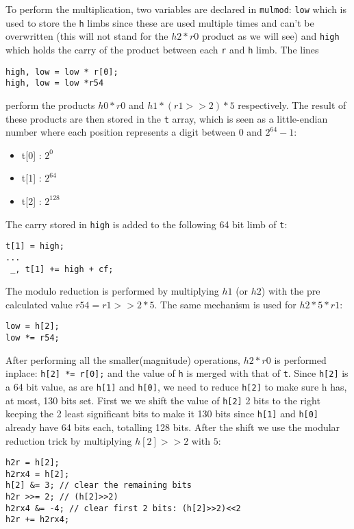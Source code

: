 \documentclass[twocolumn]{article}
\begin{document}
To perform the multiplication, two variables are declared in \texttt{mulmod}: \texttt{low} which is used to store the \texttt{h} limbs since these are used multiple
times and can't be overwritten (this will not stand for the $h2*r0$ product as we will see) and \texttt{high} which holds the carry of the product between 
each \texttt{r} and \texttt{h} limb. The lines 
\begin{Verbatim}[fontsize=\footnotesize]
high, low = low * r[0];
high, low = low *r54
\end{Verbatim}
perform the products $h0*r0$ and $h1*(r1>>2)*5$ respectively.
The result of these products are then stored in the \texttt{t} array, which is seen as a little-endian number where each position represents a digit between $0$ 
and $2^{64}-1$: 
\begin{itemize}
    \item t[0] : $2^{0}$
    \item t[1] : $2^{64}$
    \item t[2] : $2^{128}$
\end{itemize}

The carry stored in \texttt{high} is added to the following 64 bit limb of \texttt{t}:
\begin{Verbatim}[fontsize=\footnotesize]
t[1] = high;
...
 _, t[1] += high + cf;
\end{Verbatim}
The modulo reduction is performed by multiplying $h1$ (or $h2$) with the pre calculated value $r54=r1>>2*5$. The same mechanism is used for $h2*5*r1$:
\begin{Verbatim}[fontsize=\footnotesize]
low = h[2];
low *= r54;
\end{Verbatim}

After performing all the smaller(magnitude) operations, $h2*r0$ is performed inplace: \texttt{h[2] *= r[0];} and the value of \texttt{h} is merged with that
of \texttt{t}.
Since \texttt{h[2]} is a 64 bit value, as are \texttt{h[1]} and \texttt{h[0]}, we need to reduce \texttt{h[2]} to make sure h has, at most, 130 bits set. 
First we we shift the value of \texttt{h[2]} 2 bits to the right keeping the 2 least significant bits to make it 130 bits since \texttt{h[1]} and \texttt{h[0]}
already have 64 bits each, totalling 128 bits. After the shift we use the modular reduction trick by multiplying $h[2]>>2$ with $5$:
\begin{Verbatim}[fontsize=\footnotesize]
h2r = h[2];
h2rx4 = h[2];
h[2] &= 3; // clear the remaining bits
h2r >>= 2; // (h[2]>>2)
h2rx4 &= -4; // clear first 2 bits: (h[2]>>2)<<2
h2r += h2rx4;
\end{Verbatim}
\end{document}
